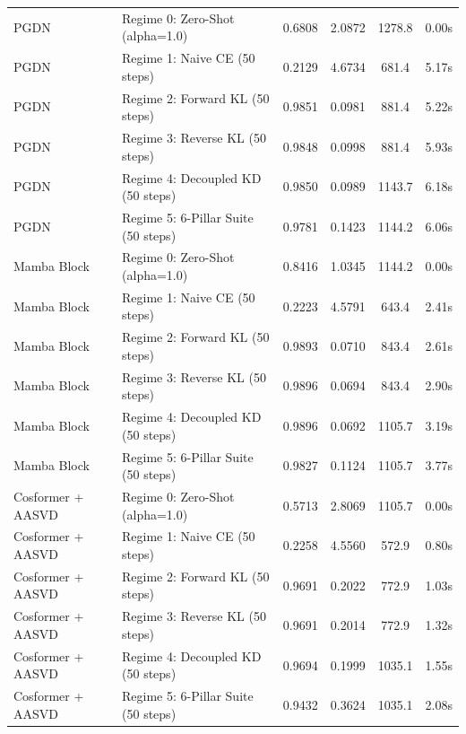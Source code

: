 \begin{table}[h]
\begin{tabular}{llcccc}
PGDN & Regime 0: Zero-Shot (alpha=1.0) & 0.6808 & 2.0872 & 1278.8 & 0.00s \\
PGDN & Regime 1: Naive CE (50 steps) & 0.2129 & 4.6734 & 681.4 & 5.17s \\
PGDN & Regime 2: Forward KL (50 steps) & 0.9851 & 0.0981 & 881.4 & 5.22s \\
PGDN & Regime 3: Reverse KL (50 steps) & 0.9848 & 0.0998 & 881.4 & 5.93s \\
PGDN & Regime 4: Decoupled KD (50 steps) & 0.9850 & 0.0989 & 1143.7 & 6.18s \\
PGDN & Regime 5: 6-Pillar Suite (50 steps) & 0.9781 & 0.1423 & 1144.2 & 6.06s \\
Mamba Block & Regime 0: Zero-Shot (alpha=1.0) & 0.8416 & 1.0345 & 1144.2 & 0.00s \\
Mamba Block & Regime 1: Naive CE (50 steps) & 0.2223 & 4.5791 & 643.4 & 2.41s \\
Mamba Block & Regime 2: Forward KL (50 steps) & 0.9893 & 0.0710 & 843.4 & 2.61s \\
Mamba Block & Regime 3: Reverse KL (50 steps) & 0.9896 & 0.0694 & 843.4 & 2.90s \\
Mamba Block & Regime 4: Decoupled KD (50 steps) & 0.9896 & 0.0692 & 1105.7 & 3.19s \\
Mamba Block & Regime 5: 6-Pillar Suite (50 steps) & 0.9827 & 0.1124 & 1105.7 & 3.77s \\
Cosformer + AASVD & Regime 0: Zero-Shot (alpha=1.0) & 0.5713 & 2.8069 & 1105.7 & 0.00s \\
Cosformer + AASVD & Regime 1: Naive CE (50 steps) & 0.2258 & 4.5560 & 572.9 & 0.80s \\
Cosformer + AASVD & Regime 2: Forward KL (50 steps) & 0.9691 & 0.2022 & 772.9 & 1.03s \\
Cosformer + AASVD & Regime 3: Reverse KL (50 steps) & 0.9691 & 0.2014 & 772.9 & 1.32s \\
Cosformer + AASVD & Regime 4: Decoupled KD (50 steps) & 0.9694 & 0.1999 & 1035.1 & 1.55s \\
Cosformer + AASVD & Regime 5: 6-Pillar Suite (50 steps) & 0.9432 & 0.3624 & 1035.1 & 2.08s \\
\bottomrule
\end{tabular}
\end{table}
